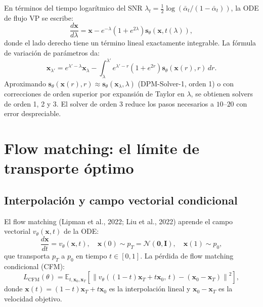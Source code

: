 En términos del tiempo logarítmico del SNR $\lambda_t = \frac{1}{2}\log
(\bar{\alpha}_t/(1-\bar{\alpha}_t))$, la ODE de flujo VP se escribe:
\begin{equation}
  \frac{d\bm{x}}{d\lambda}
  = \bm{x} - e^{-\lambda}(1+e^{2\lambda})\bm{s}_\theta(\bm{x},t(\lambda)),
  \label{eq:dpm_ode}
\end{equation}
donde el lado derecho tiene un término lineal exactamente integrable.
La fórmula de variación de parámetros da:
\[
  \bm{x}_{\lambda'} = e^{\lambda'-\lambda}\bm{x}_\lambda
  - \int_\lambda^{\lambda'} e^{\lambda'-r}(1+e^{2r})\bm{s}_\theta(\bm{x}(r),r)\,dr.
\]
Aproximando $\bm{s}_\theta(\bm{x}(r),r) \approx \bm{s}_\theta(\bm{x}_\lambda,\lambda)$
(DPM-Solver-1, orden 1) o con correcciones de orden superior por expansión de Taylor
en $\lambda$, se obtienen solvers de orden 1, 2 y 3. El solver de orden 3 reduce
los pasos necesarios a $10$--$20$ con error despreciable.

\section{Flow matching: el límite de transporte óptimo}
\label{sec:flow_matching}

\subsection{Interpolación y campo vectorial condicional}
\label{subsec:fm_campo}

El flow matching (Lipman et al., 2022; Liu et al., 2022) aprende el campo vectorial
$v_\theta(\bm{x},t)$ de la ODE:
\begin{equation}
  \frac{d\bm{x}}{dt} = v_\theta(\bm{x},t),
  \quad \bm{x}(0)\sim p_T = \mathcal{N}(\bm{0},\bm{I}),
  \quad \bm{x}(1)\sim p_0,
  \label{eq:fm_ode}
\end{equation}
que transporta $p_T$ a $p_0$ en tiempo $t\in[0,1]$. La pérdida de flow matching
condicional (CFM):
\begin{equation}
  L_{\mathrm{CFM}}(\theta)
  = \mathbb{E}_{t,\bm{x}_0,\bm{x}_T}\!\left[
  \left\|v_\theta\!\left((1-t)\bm{x}_T + t\bm{x}_0,\,t\right)
  - (\bm{x}_0 - \bm{x}_T)\right\|^2\right],
  \label{eq:cfm_loss}
\end{equation}
donde $\bm{x}(t) = (1-t)\bm{x}_T + t\bm{x}_0$ es la interpolación lineal y
$\bm{x}_0 - \bm{x}_T$ es la velocidad objetivo.

